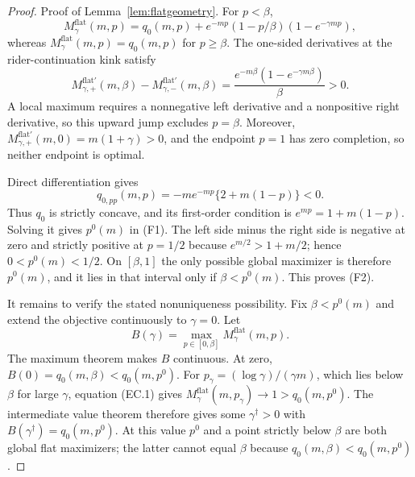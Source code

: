 \documentclass[mnsc,blindrev]{informs3}
\begin{document}
\begin{proof}{Proof of Lemma~\ref{lem:flatgeometry}.}
For $p<\beta$,
\[
 M_\gamma^{\mathrm{flat}}(m,p)=q_0(m,p)
 +e^{-mp}(1-p/\beta)(1-e^{-\gamma mp}),                  \tag{EC.1}
\]
whereas $M_\gamma^{\mathrm{flat}}(m,p)=q_0(m,p)$ for $p\ge\beta$.  The
one-sided derivatives at the rider-continuation kink satisfy
\[
 M_{\gamma,+}^{\mathrm{flat}\prime}(m,\beta)
 -M_{\gamma,-}^{\mathrm{flat}\prime}(m,\beta)
 =\frac{e^{-m\beta}(1-e^{-\gamma m\beta})}{\beta}>0.     \tag{EC.2}
\]
A local maximum requires a nonnegative left derivative and a nonpositive
right derivative, so this upward jump excludes $p=\beta$.  Moreover,
$M_{\gamma,+}^{\mathrm{flat}\prime}(m,0)=m(1+\gamma)>0$, and the endpoint $p=1$
has zero completion, so neither endpoint is optimal.

Direct differentiation gives
\[
 q_{0,pp}(m,p)=-me^{-mp}\{2+m(1-p)\}<0.                  \tag{EC.3}
\]
Thus $q_0$ is strictly concave, and its first-order condition is
$e^{mp}=1+m(1-p)$.  Solving it gives $p^0(m)$ in (F1).  The left side minus
the right side is negative at zero and strictly positive at $p=1/2$ because
$e^{m/2}>1+m/2$; hence $0<p^0(m)<1/2$.  On $[\beta,1]$ the only possible
global maximizer is therefore $p^0(m)$, and it lies in that interval only if
$\beta<p^0(m)$.  This proves (F2).

It remains to verify the stated nonuniqueness possibility.  Fix
$\beta<p^0(m)$ and extend the objective continuously to $\gamma=0$.  Let
\[
 B(\gamma)=\max_{p\in[0,\beta]}M_\gamma^{\mathrm{flat}}(m,p).
\]
The maximum theorem makes $B$ continuous.  At zero,
$B(0)=q_0(m,\beta)<q_0(m,p^0)$.  For
$p_\gamma=(\log\gamma)/(\gamma m)$, which lies below $\beta$ for large
$\gamma$, equation (EC.1) gives
$M_\gamma^{\mathrm{flat}}(m,p_\gamma)\to1>q_0(m,p^0)$.  The intermediate value theorem
therefore gives some $\gamma^\dagger>0$ with
$B(\gamma^\dagger)=q_0(m,p^0)$.  At this value $p^0$ and a point strictly
below $\beta$ are both global flat maximizers; the latter cannot equal
$\beta$ because $q_0(m,\beta)<q_0(m,p^0)$.
\Halmos\end{proof}
\end{document}
